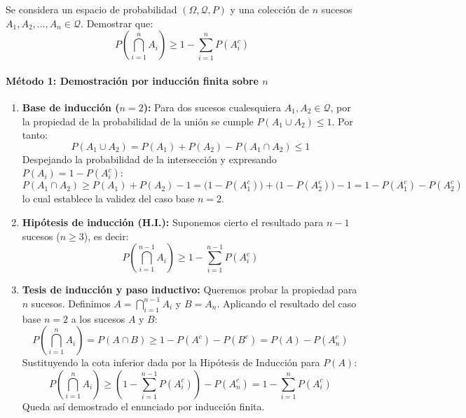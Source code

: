 \newpage

\begin{problema}
Se considera un espacio de probabilidad $(\Omega, \mathcal{Q}, P)$ y una colección de $n$ sucesos $A_1, A_2, \dots, A_n \in \mathcal{Q}$. Demostrar que:
\[
    P\left( \bigcap_{i=1}^n A_i \right) \ge 1 - \sum_{i=1}^n P(A_i^c)
\]

\tcblower

\paragraph{Método 1: Demostración por inducción finita sobre $n$}

\begin{enumerate}
    \item \textbf{Base de inducción ($n = 2$):}
    Para dos sucesos cualesquiera $A_1, A_2 \in \mathcal{Q}$, por la propiedad de la probabilidad de la unión se cumple $P(A_1 \cup A_2) \le 1$. Por tanto:
    \[
        P(A_1 \cup A_2) = P(A_1) + P(A_2) - P(A_1 \cap A_2) \le 1
    \]
    Despejando la probabilidad de la intersección y expresando $P(A_i) = 1 - P(A_i^c)$:
    \[
        P(A_1 \cap A_2) \ge P(A_1) + P(A_2) - 1 = \bigl(1 - P(A_1^c)\bigr) + \bigl(1 - P(A_2^c)\bigr) - 1 = 1 - P(A_1^c) - P(A_2^c)
    \]
    lo cual establece la validez del caso base $n = 2$.

    \item \textbf{Hipótesis de inducción (H.I.):}
    Suponemos cierto el resultado para $n - 1$ sucesos ($n \ge 3$), es decir:
    \[
        P\left( \bigcap_{i=1}^{n-1} A_i \right) \ge 1 - \sum_{i=1}^{n-1} P(A_i^c)
    \]

    \item \textbf{Tesis de inducción y paso inductivo:}
    Queremos probar la propiedad para $n$ sucesos. Definimos $A = \bigcap_{i=1}^{n-1} A_i$ y $B = A_n$. Aplicando el resultado del caso base $n = 2$ a los sucesos $A$ y $B$:
    \[
        P\left( \bigcap_{i=1}^n A_i \right) = P(A \cap B) \ge 1 - P(A^c) - P(B^c) = P(A) - P(A_n^c)
    \]
    Sustituyendo la cota inferior dada por la Hipótesis de Inducción para $P(A)$:
    \[
        P\left( \bigcap_{i=1}^n A_i \right) \ge \left( 1 - \sum_{i=1}^{n-1} P(A_i^c) \right) - P(A_n^c) = 1 - \sum_{i=1}^n P(A_i^c)
    \]
    Queda así demostrado el enunciado por inducción finita.
\end{enumerate}


\end{problema}
